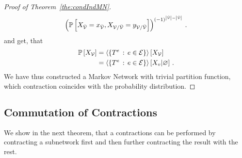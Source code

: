 \begin{proof}[Proof of Theorem~\ref{the:condIndMN}]
\begin{align*}
		\left(
			\mathbb{P}\left[X_{\bar{\mathcal{V}}}=x_{\bar{\mathcal{V}}},X_{\mathcal{V}/\bar{\mathcal{V}}}=y_{\mathcal{V}/\bar{\mathcal{V}}}\right]
		\right)^{(-1)^{\left|\tilde{\mathcal{V}}\right|-\left|\bar{\mathcal{V}}\right|}} \, . 
	\end{align*}
	and get, that 
	\begin{align*}
		\mathbb{P}\left[X_{\mathcal{V}}\right] & = \left\langle \{T^{e}\, : \, e\in\mathcal{E}\}\right\rangle \left[ X_{\mathcal{V}} \right] \\
		& = \left\langle \{T^{e}\, : \, e\in\mathcal{E}\}\right\rangle \left[ X_{v} | \varnothing \right] \, .
	\end{align*}
	We have thus constructed a Markov Network with trivial partition function, which contraction coincides with the probability distribution.
\end{proof}





\subsection{Commutation of Contractions}

We show in the next theorem, that a contractions can be performed by contracting a subnetwork first and then further contracting the result with the rest. 




